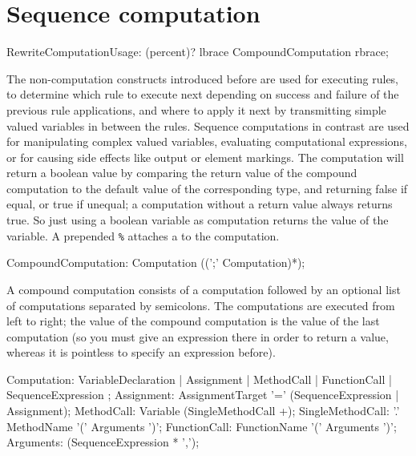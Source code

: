 \section{Sequence computation} \label{sec:seqcomp}

\begin{rail} 
  RewriteComputationUsage: (percent)? lbrace CompoundComputation rbrace; 
\end{rail}

The non-computation constructs introduced before are used for executing rules, to determine which rule to execute next depending on success and failure of the previous rule applications, and where to apply it next by transmitting simple valued variables in between the rules.
Sequence computations in contrast are used for manipulating complex valued variables, evaluating computational expressions, or for causing side effects like output or element markings.
The computation will return a boolean value by comparing the return value of the compound computation to the default value of the corresponding type, and returning false if equal, or true if unequal; a computation without a return value always returns true.
So just using a boolean variable as computation returns the value of the variable.
A prepended \texttt{\%} attaches a  to the computation.

\begin{rail} 
  CompoundComputation: Computation ((';' Computation)*); 
\end{rail}

A compound computation consists of a computation followed by an optional list of computations separated by semicolons.
The computations are executed from left to right;
the value of the compound computation is the value of the last computation (so you must give an expression there in order to return a value, whereas it is pointless to specify an expression before).

\begin{rail} 
  Computation:
     VariableDeclaration |
     Assignment |
     MethodCall |
     FunctionCall |
     SequenceExpression
  ;
	Assignment:	AssignmentTarget '=' (SequenceExpression | Assignment); 
	MethodCall: Variable (SingleMethodCall +);
	SingleMethodCall: '.' MethodName '(' Arguments ')';
	FunctionCall: FunctionName '(' Arguments ')';
	Arguments: (SequenceExpression * ',');
\end{rail}\label{recstmt}

